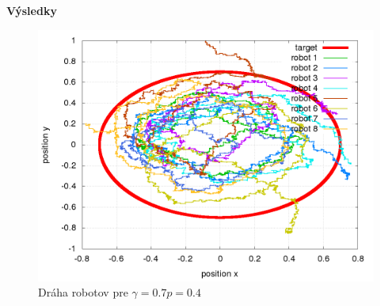 \documentclass[xcolor=dvipsnames]{beamer}
\begin{document}
\begin{frame}{\bf Výsledky}
\begin{minipage}{.5\textwidth}
    \begin{figure}[!htb]
    \centering
    \includegraphics[scale=.2]{../../results_q_learning/nano_q_learning/result_04_02/robot_path.png}
    \caption{Dráha robotov pre $\gamma = 0.7 p = 0.4$}
    \label{img:nano_q_result_04_2_path}
    \end{figure}

  \end{minipage}

\end{frame}
\end{document}
